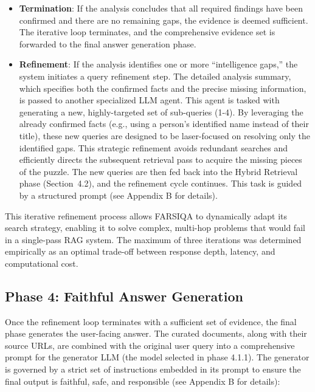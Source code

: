 \documentclass[11pt]{article}
\begin{document}
\begin{itemize}
    \item \textbf{Termination}: If the analysis concludes that all required findings have been confirmed and there are no remaining gaps, the evidence is deemed sufficient. The iterative loop terminates, and the comprehensive evidence set is forwarded to the final answer generation phase. \cite{fairrag}
    \item \textbf{Refinement}: If the analysis identifies one or more ``intelligence gaps,'' the system initiates a query refinement step. The detailed analysis summary, which specifies both the confirmed facts and the precise missing information, is passed to another specialized LLM agent. This agent is tasked with generating a new, highly-targeted set of sub-queries (1-4). By leveraging the already confirmed facts (e.g., using a person's identified name instead of their title), these new queries are designed to be laser-focused on resolving only the identified gaps. This strategic refinement avoids redundant searches and efficiently directs the subsequent retrieval pass to acquire the missing pieces of the puzzle. The new queries are then fed back into the Hybrid Retrieval phase (Section~4.2), and the refinement cycle continues. \cite{fairrag} This task is guided by a structured prompt (see Appendix B for details).
\end{itemize}

This iterative refinement process allows FARSIQA to dynamically adapt its search strategy, enabling it to solve complex, multi-hop problems that would fail in a single-pass RAG system. The maximum of three iterations was determined empirically as an optimal trade-off between response depth, latency, and computational cost.

\subsection{Phase 4: Faithful Answer Generation}

Once the refinement loop terminates with a sufficient set of evidence, the final phase generates the user-facing answer. The curated documents, along with their source URLs, are combined with the original user query into a comprehensive prompt for the generator LLM (the model selected in phase 4.1.1). The generator is governed by a strict set of instructions embedded in its prompt to ensure the final output is faithful, safe, and responsible (see Appendix B for details):
\end{document}
